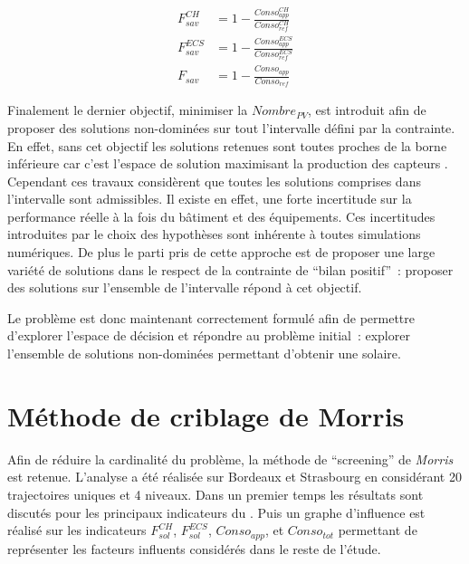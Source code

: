 \begin{align}\label{eq:taux_economie_opti}
  F_{sav}^{CH}   &= 1 - \frac{Conso_{app}^{CH}}{Conso_{ref}^{CH}} \\
  F_{sav}^{ECS}  &= 1 - \frac{Conso_{app}^{ECS}}{Conso_{ref}^{ECS}} \\
  F_{sav}        &= 1 - \frac{Conso_{app}}{Conso_{ref}}
\end{align}

Finalement le dernier objectif, minimiser la $Nombre_{PV}$, est introduit afin de proposer
des solutions non-dominées sur tout l’intervalle défini par la contrainte. En effet,
sans cet objectif les solutions retenues sont toutes proches de la borne inférieure car
c’est l’espace de solution maximisant la production des capteurs . Cependant ces
travaux considèrent que toutes les solutions comprises dans l’intervalle sont admissibles.
Il existe en effet, une forte incertitude sur la performance réelle à la fois du bâtiment
et des équipements. Ces incertitudes introduites par le choix des hypothèses sont
inhérente à toutes simulations numériques. De plus le parti pris de cette approche est de
proposer une large variété de solutions dans le respect de la contrainte de \enquote{bilan
positif}~: proposer des solutions sur l’ensemble de l’intervalle répond à cet objectif.

Le problème est donc maintenant correctement formulé afin de permettre d’explorer l’espace
de décision et répondre au problème initial~: explorer l’ensemble de solutions non-dominées
permettant d’obtenir une  solaire.



\section{Méthode de criblage de Morris} %
\label{sec:methode_criblage_de_morris}
Afin de réduire la cardinalité du problème, la méthode de \enquote{screening} de
\textit{Morris} est retenue. L’analyse a été réalisée sur Bordeaux et Strasbourg en
considérant \num{20} trajectoires uniques et \num{4} niveaux. Dans un premier temps les
résultats sont discutés pour les principaux indicateurs du . Puis un graphe
d’influence est réalisé sur les indicateurs $F_{sol}^{CH}$, $F_{sol}^{ECS}$,
$Conso_{app}$, et $Conso_{tot}$ permettant de représenter les facteurs influents
considérés dans le reste de l’étude.

